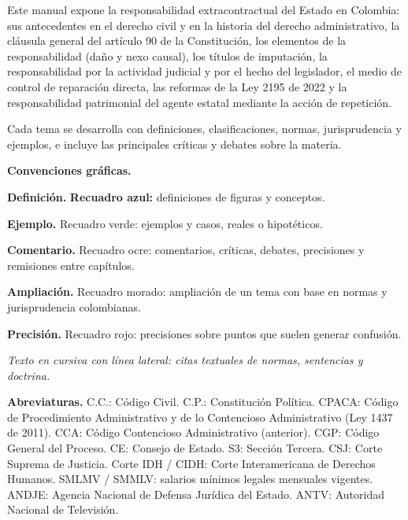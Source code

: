 
Este manual expone la responsabilidad extracontractual del Estado en Colombia: sus antecedentes en el derecho civil y en la historia del derecho administrativo, la cláusula general del artículo 90 de la Constitución, los elementos de la responsabilidad (daño y nexo causal), los títulos de imputación, la responsabilidad por la actividad judicial y por el hecho del legislador, el medio de control de reparación directa, las reformas de la Ley 2195 de 2022 y la responsabilidad patrimonial del agente estatal mediante la acción de repetición.

Cada tema se desarrolla con definiciones, clasificaciones, normas, jurisprudencia y ejemplos, e incluye las principales críticas y debates sobre la materia.

\textbf{Convenciones gráficas.}

\begin{definicion}
\textcolor[HTML]{1F3864}{\textbf{Definición. }}\textbf{Recuadro azul: }definiciones de figuras y conceptos.
\end{definicion}
\begin{ejemplo}
\textcolor[HTML]{4F6228}{\textbf{Ejemplo. }}Recuadro verde: ejemplos y casos, reales o hipotéticos.
\end{ejemplo}
\begin{comentario}
\textcolor[HTML]{8A6D3B}{\textbf{Comentario. }}Recuadro ocre: comentarios, críticas, debates, precisiones y remisiones entre capítulos.
\end{comentario}
\begin{ampliacion}
\textcolor[HTML]{5B3F8C}{\textbf{Ampliación. }}Recuadro morado: ampliación de un tema con base en normas y jurisprudencia colombianas.
\end{ampliacion}
\begin{precision}
\textcolor[HTML]{9C2B2B}{\textbf{Precisión. }}Recuadro rojo: precisiones sobre puntos que suelen generar confusión.
\end{precision}
\begin{cita}
\textit{Texto en cursiva con línea lateral: citas textuales de normas, sentencias y doctrina.}
\end{cita}
\textbf{Abreviaturas.} C.C.: Código Civil. C.P.: Constitución Política. CPACA: Código de Procedimiento Administrativo y de lo Contencioso Administrativo (Ley 1437 de 2011). CCA: Código Contencioso Administrativo (anterior). CGP: Código General del Proceso. CE: Consejo de Estado. S3: Sección Tercera. CSJ: Corte Suprema de Justicia. Corte IDH / CIDH: Corte Interamericana de Derechos Humanos. SMLMV / SMMLV: salarios mínimos legales mensuales vigentes. ANDJE: Agencia Nacional de Defensa Jurídica del Estado. ANTV: Autoridad Nacional de Televisión.
